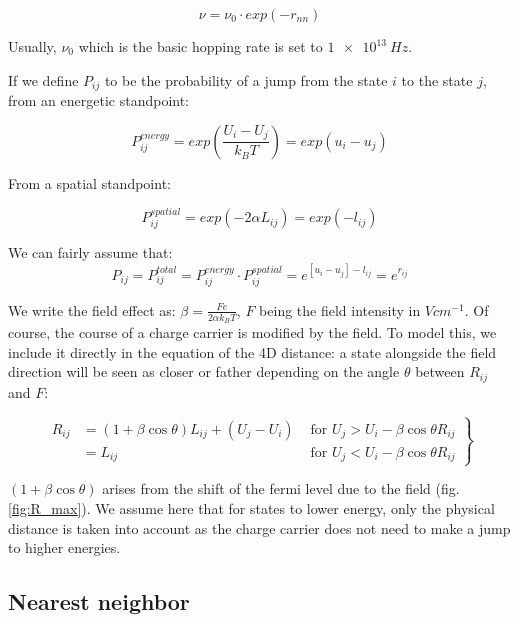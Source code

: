 \begin{equation}
    \nu = \nu_0 \cdot exp(-r_{nn})
    \label{eq:3_1.1}
\end{equation}

Usually, $\nu_0$ which is the basic hopping rate is set to $\SI{1e13}{Hz}$.

If we define $P_{ij}$ to be the probability of a jump from the state $i$ to the state $j$, from an energetic standpoint:

\begin{equation}
    P_{ij}^{energy} = exp\left(\frac{U_i - U_j}{k_BT}\right) = exp(u_i - u_j)
\end{equation}

From a spatial standpoint:

\begin{equation}
    P_{ij}^{spatial} = exp\left(-2\alpha L_{ij}\right) = exp(-l_{ij})
\end{equation}

We can fairly assume that:
\begin{equation}
    P_{ij} = P_{ij}^{total} = P_{ij}^{energy} \cdot P_{ij}^{spatial} = e^{[u_i - u_j] - l_{ij}} = e^{r_{ij}}
    \label{eq:3_1}
\end{equation}

We write the field effect as: $\beta = \frac{Fe}{2\alpha k_BT}$, $F$ being the field intensity in $V cm^{-1}$. Of course, the course of a charge carrier is modified by the field. To model this, we include it directly in the equation of the 4D distance: a state alongside the field direction will be seen as  closer or father depending on the angle $\theta$ between $R_{ij}$ and $F$:

\begin{equation}
    \left.\begin{array}{rlr}
    R_{i j} & =(1+\beta \cos \theta) L_{i j}+\left(U_{j}-U_{i}\right) & \text { for } U_{j}>U_{i}-\beta \cos \theta R_{i j} \\
    & =L_{i j} & \text { for } U_{j}<U_{i}-\beta \cos \theta R_{i j}
    \end{array}\right\}
    \label{eq:3_2}
\end{equation}

$(1+\beta \cos \theta)$ arises from the shift of the fermi level due to the field (fig. \ref{fig:R_max}). We assume here that for states to lower energy, only the physical distance is taken into account as the charge carrier does not need to make a jump to higher energies.

\subsection{Nearest neighbor}

